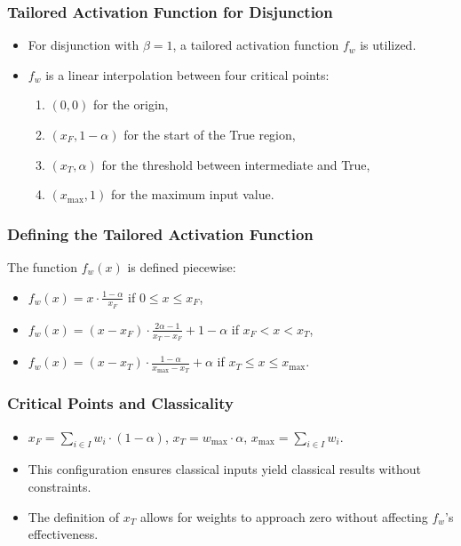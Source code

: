 \documentclass{beamer}
\begin{document}
\begin{frame}
\frametitle{Tailored Activation Function for Disjunction}
\begin{itemize}
    \item For disjunction with \(\beta = 1\), a tailored activation
      function \(f_w\) is utilized.
    \item \(f_w\) is a linear interpolation between four critical points:
    \begin{enumerate}
        \item \((0, 0)\) for the origin,
        \item \((x_F, 1 - \alpha)\) for the start of the True region,
        \item \((x_T, \alpha)\) for the threshold between intermediate and True,
        \item \((x_{\text{max}}, 1)\) for the maximum input value.
    \end{enumerate}
\end{itemize}
\end{frame}

\begin{frame}
\frametitle{Defining the Tailored Activation Function}
The function \(f_w(x)\) is defined piecewise:
\begin{itemize}
    \item \(f_w(x) = x \cdot \frac{1 - \alpha}{x_F}\) if \(0 \leq x
      \leq x_F\),
    \item \(f_w(x) = (x - x_F) \cdot \frac{2\alpha - 1}{x_T - x_F} + 1
      - \alpha\) if \(x_F < x < x_T\),
    \item \(f_w(x) = (x - x_T) \cdot \frac{1 - \alpha}{x_{\text{max}}
        - x_T} + \alpha\) if \(x_T \leq x \leq x_{\text{max}}\).
\end{itemize}
\end{frame}

\begin{frame}
\frametitle{Critical Points and Classicality}
\begin{itemize}
    \item \(x_F = \sum_{i \in I} w_i \cdot (1 - \alpha)\), \(x_T =
      w_{\text{max}} \cdot \alpha\), \(x_{\text{max}} = \sum_{i \in I}
      w_i\).
    \item This configuration ensures classical inputs yield classical
      results without constraints.
    \item The definition of \(x_T\) allows for weights to approach
      zero without affecting \(f_w\)'s effectiveness.
\end{itemize}
\end{frame}
\end{document}
